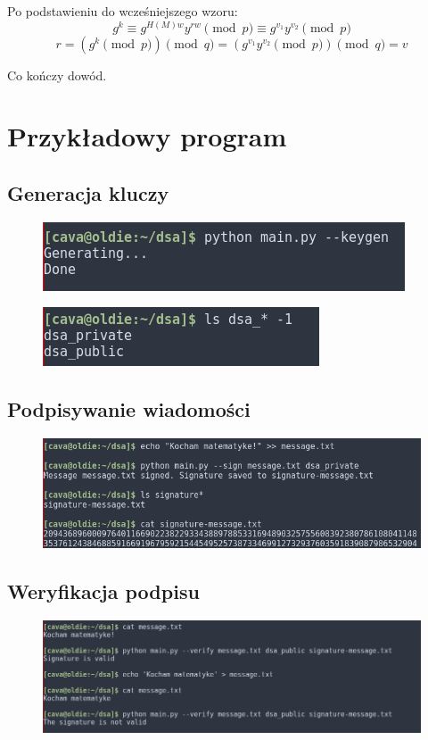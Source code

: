 \documentclass[11pt]{article}
\begin{document}
Po podstawieniu do wcześniejszego wzoru:
\begin{equation*}
  g^{k} \equiv g^{H(M)w} y^{rw} \pmod p \equiv g^{v_1}y^{v_2} \pmod p
\end{equation*}
\begin{equation*}
    r = (g^{k} \pmod p) \pmod q = (g^{v_{1}}y^{v_{2}} \pmod p) \pmod q = v
\end{equation*}

Co kończy dowód.

\pagebreak

\section{Przykładowy program}

\subsection{Generacja kluczy}
\begin{figure}[h]
  \includegraphics[scale=0.7]{keygen1.png}
  \centering
\end{figure}
\begin{figure}[h]
  \includegraphics[scale=0.7]{keygen2.png}
  \centering
\end{figure}

\subsection{Podpisywanie wiadomości}
\begin{figure}[h]
  \includegraphics[scale=0.6]{sign.png}
  \centering
\end{figure}

\subsection{Weryfikacja podpisu}
\begin{figure}[H]
  \includegraphics[scale=0.5]{verification.png}
  \centering
\end{figure}
\end{document}
